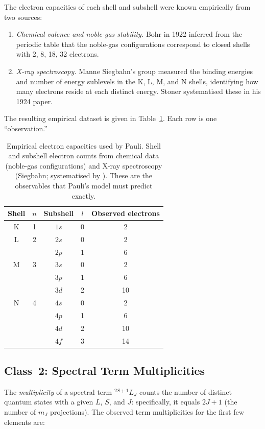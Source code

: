 \documentclass[12pt]{article}
\begin{document}
The electron capacities of each shell and subshell were known empirically
from two sources:
\begin{enumerate}
  \item \emph{Chemical valence and noble-gas stability.}  Bohr in 1922
    inferred from the periodic table that the noble-gas configurations
    correspond to closed shells with 2, 8, 18, 32 electrons.
  \item \emph{X-ray spectroscopy.}  Manne Siegbahn's group measured the
    binding energies and number of energy sublevels in the K, L, M, and N
    shells, identifying how many electrons reside at each distinct energy.
    Stoner \citeyearpar{Stoner1924} systematised these in his 1924 paper.
\end{enumerate}

The resulting empirical dataset is given in Table~\ref{tab:empirical_data}.
Each row is one ``observation.''

\begin{table}[ht]
\centering
\caption{Empirical electron capacities used by Pauli.  Shell and subshell
electron counts from chemical data (noble-gas configurations) and X-ray
spectroscopy (Siegbahn; systematised by \citealt{Stoner1924}).
These are the observables that Pauli's model must predict exactly.}
\label{tab:empirical_data}
\medskip
\begin{tabular}{ccccc}
\toprule
Shell & $n$ & Subshell & $l$ & Observed electrons \\
\midrule
K & 1 & $1s$ & 0 & 2 \\
L & 2 & $2s$ & 0 & 2 \\
  &   & $2p$ & 1 & 6 \\
M & 3 & $3s$ & 0 & 2 \\
  &   & $3p$ & 1 & 6 \\
  &   & $3d$ & 2 & 10 \\
N & 4 & $4s$ & 0 & 2 \\
  &   & $4p$ & 1 & 6 \\
  &   & $4d$ & 2 & 10 \\
  &   & $4f$ & 3 & 14 \\
\bottomrule
\end{tabular}
\end{table}

\subsection{Class~2: Spectral Term Multiplicities}

The \emph{multiplicity} of a spectral term ${}^{2S+1}L_J$ counts the number
of distinct quantum states with a given $L$, $S$, and $J$: specifically, it
equals $2J+1$ (the number of $m_J$ projections).  The observed term
multiplicities for the first few elements are:
\end{document}
